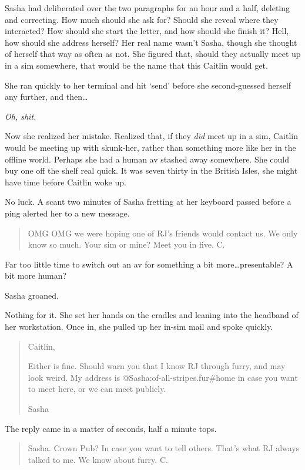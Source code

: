 Sasha had deliberated over the two paragraphs for an hour and a half, deleting and correcting. How much should she ask for? Should she reveal where they interacted? How should she start the letter, and how should she finish it? Hell, how should she address herself? Her real name wasn't Sasha, though she thought of herself that way as often as not. She figured that, should they actually meet up in a sim somewhere, that would be the name that this Caitlin would get.

She ran quickly to her terminal and hit `send' before she second-guessed herself any further, and then\ldots{}

\emph{Oh, shit.}

Now she realized her mistake. Realized that, if they \emph{did} meet up in a sim, Caitlin would be meeting up with skunk-her, rather than something more like her in the offline world. Perhaps she had a human av stashed away somewhere. She could buy one off the shelf real quick. It was seven thirty in the British Isles, she might have time before Caitlin woke up.

No luck. A scant two minutes of Sasha fretting at her keyboard passed before a ping alerted her to a new message.

\begin{quote}
OMG OMG we were hoping one of RJ's friends would contact us. We only know so much. Your sim or mine? Meet you in five. C.
\end{quote}

Far too little time to switch out an av for something a bit more\ldots{}presentable? A bit more human?

Sasha groaned.

Nothing for it. She set her hands on the cradles and leaning into the headband of her workstation. Once in, she pulled up her in-sim mail and spoke quickly.

\begin{quote}
Caitlin,

Either is fine. Should warn you that I know RJ through furry, and may look weird. My address is @Sasha:of-all-stripes.fur\#home in case you want to meet here, or we can meet publicly.

Sasha
\end{quote}

The reply came in a matter of seconds, half a minute tops.

\begin{quote}
Sasha. Crown Pub? In case you want to tell others. That's what RJ always talked to me. We know about furry. C.
\end{quote}

